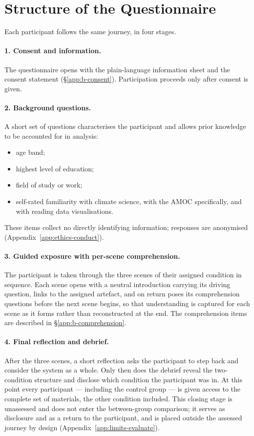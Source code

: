 \section{Structure of the Questionnaire}
\label{app:b-structure}

Each participant follows the same journey, in four stages.

\paragraph{1. Consent and information.}
The questionnaire opens with the plain-language information sheet and the consent statement (\S\ref{app:b-consent}). Participation proceeds only after consent is given.

\paragraph{2. Background questions.}
A short set of questions characterises the participant and allows prior knowledge to be accounted for in analysis:
\begin{itemize}
    \item age band;
    \item highest level of education;
    \item field of study or work;
    \item self-rated familiarity with climate science, with the AMOC specifically, and with reading data visualisations.
\end{itemize}
These items collect no directly identifying information; responses are anonymised (Appendix~\ref{app:ethics-conduct}).

\paragraph{3. Guided exposure with per-scene comprehension.}
The participant is taken through the three scenes of their assigned condition in sequence. Each scene opens with a neutral introduction carrying its driving question, links to the assigned artefact, and on return poses its comprehension questions before the next scene begins, so that understanding is captured for each scene as it forms rather than reconstructed at the end. The comprehension items are described in \S\ref{app:b-comprehension}.

\paragraph{4. Final reflection and debrief.}
After the three scenes, a short reflection asks the participant to step back and consider the system as a whole. Only then does the debrief reveal the two-condition structure and disclose which condition the participant was in. At this point every participant --- including the control group --- is given access to the complete set of materials, the other condition included. This closing stage is unassessed and does not enter the between-group comparison; it serves as disclosure and as a return to the participant, and is placed outside the assessed journey by design (Appendix~\ref{app:limits-evaluate}).


